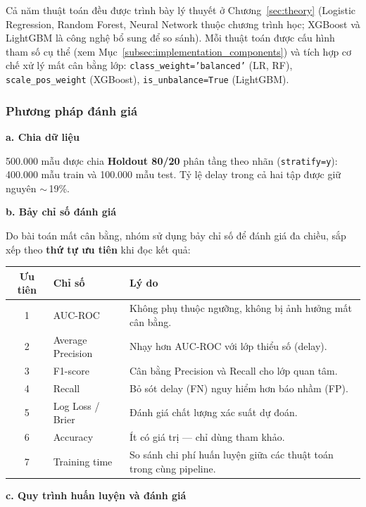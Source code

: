 Cả năm thuật toán đều được trình bày lý thuyết ở Chương~\ref{sec:theory}
(Logistic Regression, Random Forest, Neural Network thuộc chương trình học;
XGBoost và LightGBM là công nghệ bổ sung để so sánh).
Mỗi thuật toán được cấu hình tham số cụ thể
(xem Mục~\ref{subsec:implementation_components}) và tích hợp
cơ chế xử lý mất cân bằng lớp:
\texttt{class\_weight='balanced'} (LR, RF),
\texttt{scale\_pos\_weight} (XGBoost),
\texttt{is\_unbalance=True} (LightGBM).

\subsubsection{Phương pháp đánh giá}

\noindent \textbf{a. Chia dữ liệu}

500.000 mẫu được chia \textbf{Holdout 80/20} phân tầng theo nhãn
(\texttt{stratify=y}): 400.000 mẫu train và 100.000 mẫu test.
Tỷ lệ delay trong cả hai tập được giữ nguyên $\sim$\,19\%.

\noindent \textbf{b. Bảy chỉ số đánh giá}

Do bài toán mất cân bằng, nhóm sử dụng bảy chỉ số để đánh giá đa chiều,
sắp xếp theo \textbf{thứ tự ưu tiên} khi đọc kết quả:

\begin{table}[H]
\centering
\begin{tabular}{|c|l|p{8.2cm}|}
\hline
\textbf{Ưu tiên} & \textbf{Chỉ số} & \textbf{Lý do} \\ \hline
1 & AUC-ROC & Không phụ thuộc ngưỡng, không bị ảnh hưởng mất cân bằng. \\ \hline
2 & Average Precision & Nhạy hơn AUC-ROC với lớp thiểu số (delay). \\ \hline
3 & F1-score & Cân bằng Precision và Recall cho lớp quan tâm. \\ \hline
4 & Recall & Bỏ sót delay (FN) nguy hiểm hơn báo nhầm (FP). \\ \hline
5 & Log Loss / Brier & Đánh giá chất lượng xác suất dự đoán. \\ \hline
6 & Accuracy & Ít có giá trị --- chỉ dùng tham khảo. \\ \hline
7 & Training time & So sánh chi phí huấn luyện giữa các thuật toán trong cùng pipeline. \\ \hline
\end{tabular}
\end{table}

\noindent \textbf{c. Quy trình huấn luyện và đánh giá}

